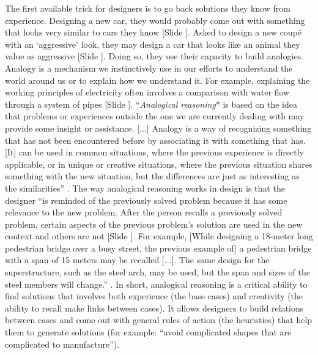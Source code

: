 \documentclass{article}
\newcounter{slide}
\begin{document}
The first available trick for designers is to go back solutions they know from experience. Designing a new car, they would probably come out with something that looks very similar to cars they know {\color{blue}[Slide ]}. Asked to design a new coupé with an `aggressive' look, they may design a car that looks like an animal they value as aggressive {\color{blue}[Slide ]}. Doing so, they use their capacity to build analogies. Analogy is a mechanism we instinctively use in our efforts to understand the world around us or to explain how we understand it. For example, explaining the working principles of electricity often involves a comparison with water flow through a system of pipes {\color{blue}[Slide ]}. ``\emph{Analogical reasoning}* is based on the idea that problems or experiences outside the one we are currently dealing with may provide some insight or assistance. [...] Analogy is a way of recognizing something that has not been encountered before by associating it with something that has. [It] can be used in common situations, where the previous experience is directly applicable, or in unique or creative situations, where the previous situation shares something with the new situation, but the differences are just as interesting as the similarities'' \cite[p. 1]{maher2014case}. The way analogical reasoning works in design is that the designer ``is reminded of the previously solved problem because it has some relevance to the new problem. After the person recalls a previously solved problem, certain aspects of the previous problem's solution are used in the new context and others are not {\color{blue}[Slide ]}. For example, [While designing a 18-meter long pedestrian bridge over a busy street, the previous example of] a pedestrian bridge with a span of 15 meters may be recalled [...]. The same design for the superstructure, such as the steel arch, may be used, but the span and sizes of the steel members will change.'' \cite[p. 1-4]{maher2014case}. In short, analogical reasoning is a critical ability to find solutions that involves both experience (the base cases) and creativity (the ability to recall make links between cases). It allows designers to build relations between cases and come out with general rules of action (the heuristics) that help them to generate solutions (for example: ``avoid complicated shapes that are complicated to manufacture''). 
\end{document}
